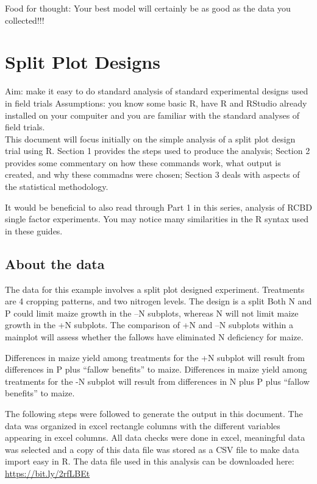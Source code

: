 \documentclass[]{book}
\theoremstyle{definition}
\theoremstyle{definition}
\theoremstyle{definition}
\theoremstyle{remark}
\begin{document}
Food for thought: Your best model will certainly be as good as the data
you collected!!!

\chapter{Split Plot Designs}\label{split-plot-designs}

Aim: make it easy to do standard analysis of standard experimental
designs used in field trials Assumptions: you know some basic R, have R
and RStudio already installed on your compuiter and you are familiar
with the standard analyses of field trials.\\
This document will focus initially on the simple analysis of a split
plot design trial using R. Section 1 provides the steps used to produce
the analysis; Section 2 provides some commentary on how these commands
work, what output is created, and why these commadns were chosen;
Section 3 deals with aspects of the statistical methodology.

It would be beneficial to also read through Part 1 in this series,
analysis of RCBD single factor experiments. You may notice many
similarities in the R syntax used in these guides.

\section{About the data}\label{about-the-data-1}

The data for this example involves a split plot designed experiment.
Treatments are 4 cropping patterns, and two nitrogen levels. The design
is a split Both N and P could limit maize growth in the --N subplots,
whereas N will not limit maize growth in the +N subplots. The comparison
of +N and --N subplots within a mainplot will assess whether the fallows
have eliminated N deficiency for maize.

Differences in maize yield among treatments for the +N subplot will
result from differences in P plus ``fallow benefits'' to maize.
Differences in maize yield among treatments for the -N subplot will
result from differences in N plus P plus ``fallow benefits'' to maize.

The following steps were followed to generate the output in this
document. The data was organized in excel rectangle columns with the
different variables appearing in excel columns. All data checks were
done in excel, meaningful data was selected and a copy of this data file
was stored as a CSV file to make data import easy in R. The data file
used in this analysis can be downloaded here:
\url{https://bit.ly/2rfLBEt}
\end{document}
